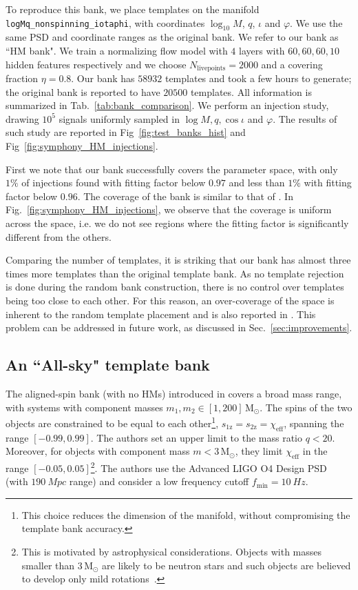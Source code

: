 \documentclass[twocolumn,showpacs,preprintnumbers,nofootinbib,prd,
superscriptaddress,10pt]{revtex4-2}
\begin{document}
To reproduce this bank, we place templates on the manifold \texttt{logMq\_nonspinning\_iotaphi}, with coordinates $\log_{10}M$, $q$, $\iota$ and $\varphi$. We use the same PSD and coordinate ranges as the original bank. We refer to our bank as ``HM bank".
We train a normalizing flow model with $4$ layers with $60, 60, 60, 10$ hidden features respectively and we choose $N_\text{livepoints} = 2000$ and a covering fraction $\eta = 0.8$.
Our bank has $58932$ templates and took a few hours to generate; the original bank is reported to have $20500$ templates.
All information is summarized in Tab.~\ref{tab:bank_comparison}.
We perform an injection study, drawing $10^5$ signals uniformly sampled in $\log M, q, \cos\iota$ and $\varphi$. The results of such study are reported in Fig~\ref{fig:test_banks_hist} and Fig~\ref{fig:symphony_HM_injections}.

First we note that our bank successfully covers the parameter space, with only $1\%$ of injections found with fitting factor below $0.97$ and less than $1\%$ with fitting factor below $0.96$. The coverage of the bank is similar to that of \cite{Harry:2017weg}.
In Fig.~\ref{fig:symphony_HM_injections}, we observe that the coverage is uniform across the space, i.e. we do not see regions where the fitting factor is significantly different from the others.

Comparing the number of templates, it is striking that our bank has almost three times more templates than the original template bank.
As no template rejection is done during the random bank construction, there is no control over templates being too close to each other. For this reason, an over-coverage of the space is inherent to the random template placement and is also reported in \cite{Messenger:2008ta,Coogan:2022qxs}. This problem can be addressed in future work, as discussed in Sec.~\ref{sec:improvements}.

\subsection{An ``All-sky" template bank} \label{sec:all_sky_comparison}

The aligned-spin bank (with no HMs) introduced in \cite{Sakon:2022ibh} covers a broad mass range, with systems with component masses $m_1, m_2 \in [1,200]\,\mathrm{M_\odot}$. The spins of the two objects are constrained to be equal to each other\footnote{This choice reduces the dimension of the manifold, without compromising the template bank accuracy.}, ${s_\text{1z} = s_\text{2z} = \chi_\text{eff}}$, spanning the range $[-0.99, 0.99]$.
The authors set an upper limit to the mass ratio $q<20$. Moreover, for objects with component mass $m<3\,\mathrm{M_\odot}$, they limit $\chi_\text{eff}$ in the range $[-0.05, 0.05]$\footnote{This is motivated by astrophysical considerations. Objects with masses smaller than $3\,\mathrm{M_\odot}$ are likely to be neutron stars and such objects are believed to develop only mild rotations~\cite{Zhu:2017znf}.}.
The authors use the Advanced LIGO O4 Design PSD (with $\SI{190}{Mpc}$ range) \cite{O4_PSDs} and consider a low frequency cutoff ${f_\text{min} = \SI{10}{Hz}}$.
\end{document}
